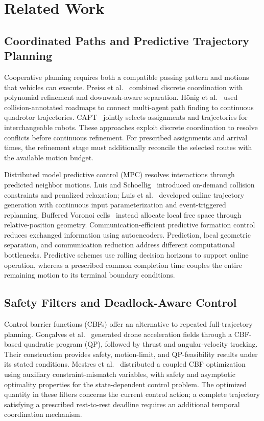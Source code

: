 \section{Related Work}
\label{sec:related}
\subsection{Coordinated Paths and Predictive Trajectory Planning}
Cooperative planning requires both a compatible passing pattern and motions that vehicles can execute. Preiss et al.~\cite{preiss2017} combined discrete coordination with polynomial refinement and downwash-aware separation. H\"onig et al.~\cite{hoenig2018} used collision-annotated roadmaps to connect multi-agent path finding to continuous quadrotor trajectories. CAPT~\cite{turpin2014} jointly selects assignments and trajectories for interchangeable robots. These approaches exploit discrete coordination to resolve conflicts before continuous refinement. For prescribed assignments and arrival times, the refinement stage must additionally reconcile the selected routes with the available motion budget.

Distributed model predictive control (MPC) resolves interactions through predicted neighbor motions. Luis and Schoellig~\cite{luis2019} introduced on-demand collision constraints and penalized relaxation; Luis et al.~\cite{luis2020} developed online trajectory generation with continuous input parameterization and event-triggered replanning. Buffered Voronoi cells~\cite{zhou2017bvc} instead allocate local free space through relative-position geometry. Communication-efficient predictive formation control~\cite{schiz2025communication} reduces exchanged information using autoencoders. Prediction, local geometric separation, and communication reduction address different computational bottlenecks. Predictive schemes use rolling decision horizons to support online operation, whereas a prescribed common completion time couples the entire remaining motion to its terminal boundary conditions.

\subsection{Safety Filters and Deadlock-Aware Control}
Control barrier functions (CBFs) offer an alternative to repeated full-trajectory planning. Gon\c{c}alves et al.~\cite{goncalves2024} generated drone acceleration fields through a CBF-based quadratic program (QP), followed by thrust and angular-velocity tracking. Their construction provides safety, motion-limit, and QP-feasibility results under its stated conditions. Mestres et al.~\cite{mestre2024} distributed a coupled CBF optimization using auxiliary constraint-mismatch variables, with safety and asymptotic optimality properties for the state-dependent control problem. The optimized quantity in these filters concerns the current control action; a complete trajectory satisfying a prescribed rest-to-rest deadline requires an additional temporal coordination mechanism.

